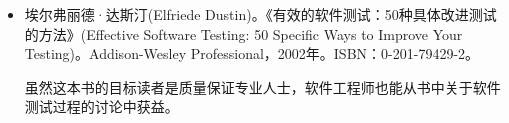 \begin{itemize}
\item
埃尔弗丽德·达斯汀(Elfriede Dustin)。《有效的软件测试：50种具体改进测试的方法》(Effective Software Testing: 50 Specific Ways to Improve Your Testing)。Addison-Wesley Professional，2002年。ISBN：0-201-79429-2。

\hspace*{\fill}

虽然这本书的目标读者是质量保证专业人士，软件工程师也能从书中关于软件测试过程的讨论中获益。
\end{itemize}